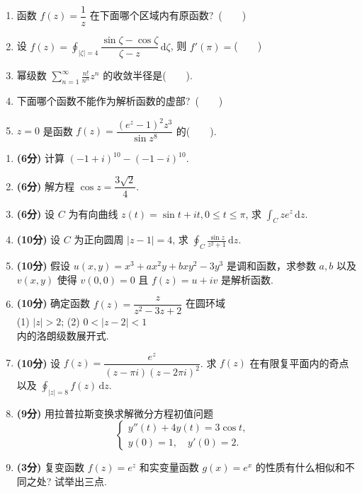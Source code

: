 \documentclass[simple]{hfutexam}
\newcommand{\diff}{\,\mathrm{d}}
\let\Re\relax\DeclareMathOperator{\Re}{Re}
\begin{document}
\begin{enumerate}
\item 函数 $f(z)=\dfrac 1z$ 在下面哪个区域内有原函数?~(~~~~)
\xx{$0<|z|<1$}{$\Re z>0$}{$|z-1|>2$}{$|z+1|+|z-1|>4$}
\item 设 $f(z)=\displaystyle\oint_{|\zeta|=4}\dfrac{\sin\zeta-\cos\zeta}{\zeta-z}\diff\zeta$, 则 $f'(\pi)=$(~~~~)
\item 幂级数 $\displaystyle\sum_{n=1}^\infty \frac{n!}{n^n}z^n$ 的收敛半径是(~~~~).
\item 下面哪个函数不能作为解析函数的虚部?~(~~~~)
\item $z=0$ 是函数 $f(z)=\dfrac{(e^z-1)^2z^3}{\sin z^8}$ 的(~~~~).
\end{enumerate}


\begin{enumerate}
\item \textbf{(6分)} 计算 $(-1+i)^{10}-(-1-i)^{10}$.
\item \textbf{(6分)} 解方程 $\cos z=\dfrac{3\sqrt2}4$.
\item \textbf{(6分)} 设 $C$ 为有向曲线 $z(t)=\sin t+it,0\le t\le \pi$, 求 $\displaystyle\int_C ze^z \diff z$.
\item \textbf{(10分)} 设 $C$ 为正向圆周 $|z-1|=4$, 求 $\displaystyle\oint_C\frac{\sin z}{z^2+1}\diff z$.
\item \textbf{(10分)} 假设 $u(x,y)=x^3+ax^2y+bxy^2-3y^3$ 是调和函数，求参数 $a,b$ 以及 $v(x,y)$ 使得 $v(0,0)=0$ 且 $f(z)=u+iv$ 是解析函数.
\item \textbf{(10分)} 确定函数 $f(z)=\dfrac{z}{z^2-3z+2}$ 在圆环域\\[6pt]
\indent (1) $|z|>2$; \hspace{2em} (2) $0<|z-2|<1$\\
内的洛朗级数展开式.
\item \textbf{(10分)} 设 $f(z)=\dfrac{e^z}{(z-\pi i)(z-2\pi i)^2}$. 求 $f(z)$ 在有限复平面内的奇点以及 $\displaystyle\oint_{|z|=8}f(z)\diff z$.
\item \textbf{(9分)} 用拉普拉斯变换求解微分方程初值问题
\[\begin{cases}
y''(t)+4y(t)=3\cos t,&\\
y(0)=1,\quad y'(0)=2.
\end{cases}\]
\item \textbf{(3分)} 复变函数 $f(z)=e^z$ 和实变量函数 $g(x)=e^x$ 的性质有什么相似和不同之处? 试举出三点.
\end{enumerate}
\end{document}
